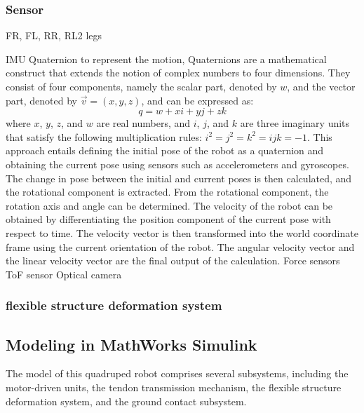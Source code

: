 \subsubsection{Sensor}

\ac{FR}, \ac{FL}, \ac{RR}, \ac{RL2} legs 

\ac{IMU} Quaternion to represent the motion, Quaternions are a mathematical construct that extends the notion of complex numbers to four dimensions. They consist of four components, namely the scalar part, denoted by $w$, and the vector part, denoted by $\vec{v}=(x, y, z)$, and can be expressed as:
$$q = w + xi + yj + zk$$
where $x$, $y$, $z$, and $w$ are real numbers, and $i$, $j$, and $k$ are three imaginary units that satisfy the following multiplication rules: $i^2 = j^2 = k^2 = ijk = -1$. This approach entails defining the initial pose of the robot as a quaternion and obtaining the current pose using sensors such as accelerometers and gyroscopes. The change in pose between the initial and current poses is then calculated, and the rotational component is extracted. From the rotational component, the rotation axis and angle can be determined. The velocity of the robot can be obtained by differentiating the position component of the current pose with respect to time. The velocity vector is then transformed into the world coordinate frame using the current orientation of the robot. The angular velocity vector and the linear velocity vector are the final output of the calculation.
Force sensors 
\ac{ToF} sensor 
Optical camera

\subsubsection{flexible structure deformation system}





\subsection{Modeling in MathWorks Simulink\texorpdfstring{\textsuperscript{\textregistered}}{(R)}}
The model of this quadruped robot comprises several subsystems, including the motor-driven units, the tendon transmission mechanism, the flexible structure deformation system, and the ground contact subsystem. 


